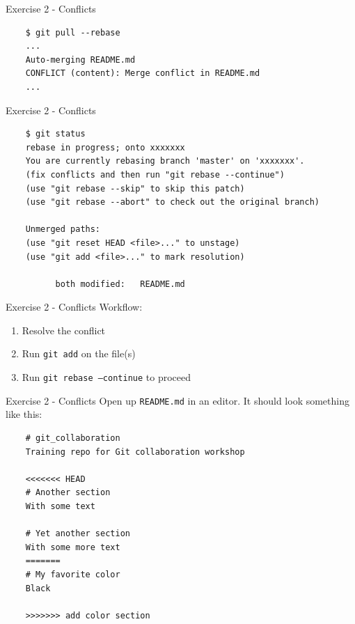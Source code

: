 \documentclass{beamer}
\newcommand{\fmtcmd}[1]{\texttt{#1}}
\begin{document}
\begin{frame}[fragile]{Exercise 2 - Conflicts}
  \begin{verbatim}
    $ git pull --rebase
    ...
    Auto-merging README.md
    CONFLICT (content): Merge conflict in README.md
    ...
  \end{verbatim}
\end{frame}

\begin{frame}[fragile]{Exercise 2 - Conflicts}
  \begin{verbatim}
    $ git status
    rebase in progress; onto xxxxxxx
    You are currently rebasing branch 'master' on 'xxxxxxx'.
    (fix conflicts and then run "git rebase --continue")
    (use "git rebase --skip" to skip this patch)
    (use "git rebase --abort" to check out the original branch)

    Unmerged paths:
    (use "git reset HEAD <file>..." to unstage)
    (use "git add <file>..." to mark resolution)

          both modified:   README.md
  \end{verbatim}
\end{frame}

\begin{frame}{Exercise 2 - Conflicts}
  Workflow:

  \begin{enumerate}
    \item Resolve the conflict
    \item Run \fmtcmd{git add} on the file(s)
    \item Run \fmtcmd{git rebase --continue} to proceed
  \end{enumerate}
\end{frame}

\begin{frame}[fragile]{Exercise 2 - Conflicts}
  Open up \fmtcmd{README.md} in an editor. It should look something like this:

  \begin{verbatim}
    # git_collaboration
    Training repo for Git collaboration workshop

    <<<<<<< HEAD
    # Another section
    With some text

    # Yet another section
    With some more text
    =======
    # My favorite color
    Black

    >>>>>>> add color section
  \end{verbatim}
\end{frame}
\end{document}

